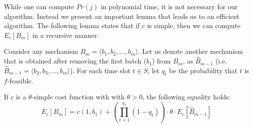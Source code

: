 While one can compute $Pr(j)$ in polynomial time, it is not necessary for our algorithm. Instead we present an important lemma that leads us to an efficient algorithm. The following lemma states that if $c$ is simple, then we can compute $E_c[B_{m}]$ in a recursive manner.
\begin{lemma} \label{bdoodle:lemma:recurrence} 
	Consider any mechanism $B_m = \langle b_1, b_2, \dots, b_m \rangle$. Let us denote another mechanism that is obtained after removing the first batch ($b_1$) from $B_m$, as $\hat{B}_{m-1}$ (i.e. $\hat{B}_{m-1} = \langle b_2, b_3, \dots, b_m \rangle$). For each time slot $t \in S$, let $q_t$ be the probability that $t$ is $f$-feasible.

If $c$ is a $\theta$-simple cost function with with $\theta > 0$, the following equality holds:
\begin{equation} \label{bdoodle:eqn:recurrence}
E_c[B_{m}] = c(1, b_1) +  \left(\prod_{t=1}^{b_1} \left(1 - q_t\right)\right) \cdot \theta \cdot E_c[\hat{B}_{m-1}]
\end{equation}
\end{lemma}
